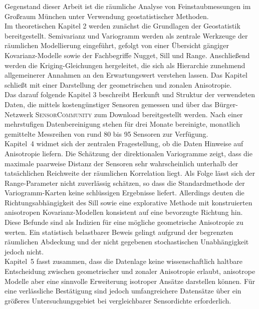 \label{KapitelZusammenfassung}
Gegenstand dieser Arbeit ist die räumliche Analyse von
Feinstaubmessungen im Großraum München unter Verwendung
geostatistischer Methoden. \\


Im theoretischen Kapitel 2 werden zunächst die Grundlagen der Geostatistik
bereitgestellt. Semivarianz und Variogramm werden als zentrale Werkzeuge 
der räumlichen Modellierung eingeführt, gefolgt von einer Übersicht 
gängiger Kovarianz-Modelle sowie der Fachbegriffe Nugget, Sill und Range.
Anschließend werden die Kriging-Gleichungen hergeleitet, die sich als 
Hierarchie zunehmend allgemeinerer Annahmen an den Erwartungswert 
verstehen lassen. 
Das Kapitel schließt mit einer Darstellung der geometrischen und 
zonalen Anisotropie.\\

Das darauf folgende Kapitel 3 beschreibt Herkunft und Struktur der verwendeten
Daten, die mittels kostengünstiger Sensoren gemessen und über das 
Bürger-Netzwerk \textsc{SensorCommunity} zum Download bereitgestellt werden. 
Nach einer mehrstufigen Datenbereinigung stehen für drei Monate bereinigte,
monatlich gemittelte Messreihen von rund 80 bis 95 Sensoren zur Verfügung. \\

Kapitel~4 widmet sich der zentralen Fragestellung, ob die Daten Hinweise auf
Anisotropie liefern. Die Schätzung der direktionalen Variogramme zeigt, dass die maximale 
paarweise Distanz der Sensoren sehr wahrscheinlich  
unterhalb der tat\-säch\-li\-chen Reichweite der räumlichen Korrelation liegt. Als Folge lässt sich der 
Range-Parameter nicht zuverlässig schätzen, so dass
die Standardmethode der Variogramm-Karten keine 
schlüssigen Ergebnisse liefert. Allerdings deuten 
die Richtungs\-ab\-hängig\-keit des Sill sowie eine 
explorative Methode mit konstruierten 
anisotropen Kovarianz-Modellen konsistent auf eine bevorzugte Richtung hin. 
Diese Befunde sind als Indizien für eine mögliche
geometrische Anisotropie zu werten. Ein statistisch
belastbarer Beweis gelingt aufgrund der begrenzten räumlichen 
Abdeckung und der nicht gegebenen stochastischen Unabhängigkeit 
jedoch nicht. \\

Kapitel~5 fasst zusammen, dass die Datenlage keine wissenschaftlich haltbare
Entscheidung zwischen geometrischer und zonaler Anisotropie erlaubt, anisotrope Modelle
aber eine sinnvolle Erweiterung isotroper Ansätze darstellen können. Für eine 
verlässliche Bestätigung sind jedoch umfangreichere Datensätze 
über ein größeres Untersuchungsgebiet bei vergleichbarer 
Sensordichte erforderlich. 


